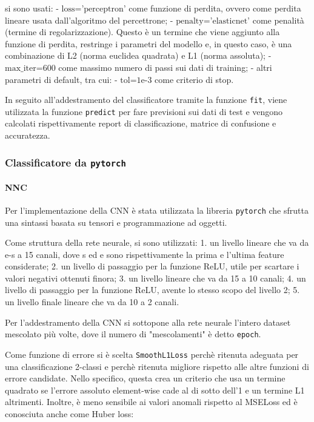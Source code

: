 \documentclass[11pt]{article}
\begin{document}
si sono usati: - \(\text{loss='perceptron'}\) come funzione di perdita,
ovvero come perdita lineare usata dall'algoritmo del percettrone; -
\(\text{penalty='elasticnet'}\) come penalità (termine di
regolarizzazione). Questo è un termine che viene aggiunto alla funzione
di perdita, restringe i parametri del modello e, in questo caso, è una
combinazione di L2 (norma euclidea quadrata) e L1 (norma assoluta); -
\(\text{max_iter=600}\) come massimo numero di passi sui dati di
training; - altri parametri di default, tra cui: - \(\text{tol=1e-3}\)
come criterio di stop.

In seguito all'addestramento del classificatore tramite la funzione
\texttt{fit}, viene utilizzata la funzione \texttt{predict} per fare
previsioni sui dati di test e vengono calcolati rispettivamente report
di classificazione, matrice di confusione e accuratezza.

    \subsubsection{\texorpdfstring{Classificatore da
\texttt{pytorch}}{Classificatore da pytorch}}\label{classificatore-da-pytorch}

    \paragraph{NNC}\label{nnc}

    Per l'implementazione della CNN è stata utilizzata la libreria
\texttt{pytorch} che sfrutta una sintassi basata su tensori e
programmazione ad oggetti.

Come struttura della rete neurale, si sono utilizzati: 1. un livello
lineare che va da e-s a 15 canali, dove s ed e sono rispettivamente la
prima e l'ultima feature considerate; 2. un livello di passaggio per la
funzione ReLU, utile per scartare i valori negativi ottenuti finora; 3.
un livello lineare che va da 15 a 10 canali; 4. un livello di passaggio
per la funzione ReLU, avente lo stesso scopo del livello 2; 5. un
livello finale lineare che va da 10 a 2 canali.

Per l'addestramento della CNN si sottopone alla rete neurale l'intero
dataset mescolato più volte, dove il numero di "mescolamenti" è detto
\texttt{epoch}.

Come funzione di errore si è scelta \texttt{SmoothL1Loss} perchè
ritenuta adeguata per una classificazione 2-classi e perchè ritenuta
migliore rispetto alle altre funzioni di errore candidate. Nello
specifico, questa crea un criterio che usa un termine quadrato se
l'errore assoluto element-wise cade al di sotto dell'1 e un termine L1
altrimenti. Inoltre, è meno sensibile ai valori anomali rispetto al
MSELoss ed è conosciuta anche come Huber loss:
\end{document}
